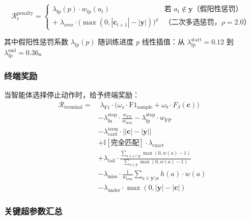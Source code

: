 \documentclass[12pt,a4paper]{article}
\newcommand{\reward}{\mathcal{R}}
\newcommand{\selected}{\mathbf{c}}
\newcommand{\trueSE}{\mathbf{y}}
\begin{document}
\begin{equation}
\reward_t^{\text{penalty}} = 
\begin{cases}
    \lambda_{\text{fp}}(p) \cdot w_{\text{fp}}(a_t) & \text{若 } a_t \notin \trueSE \text{（假阳性惩罚）} \\
    + \; \lambda_{\text{over}} \cdot \big(\max(0, |\selected_{t+1}| - |\trueSE|)\big)^{\rho} & \text{（二次多选惩罚，}\rho = 2.0\text{）}
\end{cases}
\end{equation}

其中假阳性惩罚系数 $\lambda_{\text{fp}}(p)$ 随训练进度 $p$ 线性插值：从 $\lambda_{\text{fp}}^{\text{start}} = 0.12$ 到 $\lambda_{\text{fp}}^{\text{end}} = 0.36$。

\subsubsection{终端奖励}

当智能体选择停止动作时，给予终端奖励：
\begin{equation}
\begin{aligned}
\reward_{\text{terminal}} = &\;\lambda_{\text{F1}} \cdot \big(\omega_s \cdot \text{F1}_{\text{sample}} + \omega_b \cdot F_{\beta}(\selected)\big) \\
& - \lambda_{\text{fn}}^{\text{stop}} \cdot \frac{w_{\text{FN}}}{w_{\text{true}}} - \lambda_{\text{fp}}^{\text{stop}} \cdot w_{\text{FP}} \\
& - \lambda_{\text{card}}^{\text{term}} \cdot \big||\selected| - |\trueSE|\big| \\
& + \mathbb{I}[\text{完全匹配}] \cdot \lambda_{\text{exact}} \\
& + \lambda_{\text{tail}} \cdot \frac{\sum_{a \in \selected \cap \trueSE} \max(0, w(a)-1)}{\sum_{a \in \trueSE} \max(0, w(a)-1)} \\
& - \lambda_{\text{miss}} \cdot \frac{1}{w_{\text{true}}} \sum_{a \in \trueSE \setminus \selected} h(a) \cdot w(a) \\
& - \lambda_{\text{under}} \cdot \max(0, |\trueSE| - |\selected|)
\end{aligned}
\end{equation}

\subsubsection{关键超参数汇总}
\end{document}
